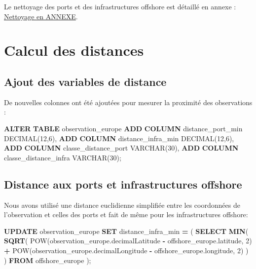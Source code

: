 \documentclass[mstat,12pt]{unswthesis}
\newenvironment{Shaded}{\begin{snugshade}}{\end{snugshade}}
\newcommand{\DataTypeTok}[1]{\textcolor[rgb]{0.13,0.29,0.53}{#1}}
\newcommand{\DecValTok}[1]{\textcolor[rgb]{0.00,0.00,0.81}{#1}}
\newcommand{\FunctionTok}[1]{\textcolor[rgb]{0.13,0.29,0.53}{\textbf{#1}}}
\newcommand{\KeywordTok}[1]{\textcolor[rgb]{0.13,0.29,0.53}{\textbf{#1}}}
\newcommand{\NormalTok}[1]{#1}
\newcommand{\OperatorTok}[1]{\textcolor[rgb]{0.81,0.36,0.00}{\textbf{#1}}}
\begin{document}
Le nettoyage des ports et des infrastructures offshore est détaillé en
annexe : \hyperref[annexe-nettoyage-donnees]{Nettoyage en ANNEXE}.

\section{Calcul des distances}\label{calcul-des-distances}

\subsection{Ajout des variables de
distance}\label{ajout-des-variables-de-distance}

De nouvelles colonnes ont été ajoutées pour mesurer la proximité des
observations :

\begin{Shaded}
\begin{Highlighting}[]
\KeywordTok{ALTER} \KeywordTok{TABLE}\NormalTok{ observation\_europe}
\KeywordTok{ADD} \KeywordTok{COLUMN}\NormalTok{ distance\_port\_min }\DataTypeTok{DECIMAL}\NormalTok{(}\DecValTok{12}\NormalTok{,}\DecValTok{6}\NormalTok{),}
\KeywordTok{ADD} \KeywordTok{COLUMN}\NormalTok{ distance\_infra\_min }\DataTypeTok{DECIMAL}\NormalTok{(}\DecValTok{12}\NormalTok{,}\DecValTok{6}\NormalTok{),}
\KeywordTok{ADD} \KeywordTok{COLUMN}\NormalTok{ classe\_distance\_port }\DataTypeTok{VARCHAR}\NormalTok{(}\DecValTok{30}\NormalTok{),}
\KeywordTok{ADD} \KeywordTok{COLUMN}\NormalTok{ classe\_distance\_infra }\DataTypeTok{VARCHAR}\NormalTok{(}\DecValTok{30}\NormalTok{);}
\end{Highlighting}
\end{Shaded}

\subsection{Distance aux ports et infrastructures
offshore}\label{distance-aux-ports-et-infrastructures-offshore}

Nous avons utilisé une distance euclidienne simplifiée entre les
coordonnées de l'observation et celles des ports et fait de même pour
les infrastructures offshore:

\begin{Shaded}
\begin{Highlighting}[]
\KeywordTok{UPDATE}\NormalTok{ observation\_europe }
\KeywordTok{SET}\NormalTok{ distance\_infra\_min }\OperatorTok{=}\NormalTok{ (}
    \KeywordTok{SELECT} \FunctionTok{MIN}\NormalTok{(}
        \FunctionTok{SQRT}\NormalTok{(}
\NormalTok{            POW(observation\_europe.decimalLatitude }\OperatorTok{{-}}\NormalTok{ offshore\_europe.latitude, }\DecValTok{2}\NormalTok{) }\OperatorTok{+}
\NormalTok{            POW(observation\_europe.decimalLongitude }\OperatorTok{{-}}\NormalTok{ offshore\_europe.longitude, }\DecValTok{2}\NormalTok{)}
\NormalTok{        )}
\NormalTok{    )}
    \KeywordTok{FROM}\NormalTok{ offshore\_europe }
\NormalTok{);}
\end{Highlighting}
\end{Shaded}
\end{document}
